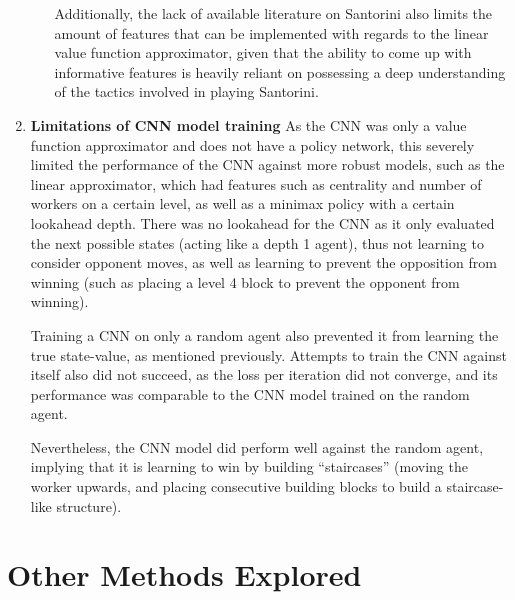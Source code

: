 \documentclass[a4paper,12pt,table]{article}
\begin{document}
\begin{enumerate}
\begin{itemize}
        Additionally, the lack of available literature on Santorini also limits the amount of features that can be implemented with regards to the linear value function approximator, given that the ability to come up with informative features is heavily reliant on possessing a deep understanding of the tactics involved in playing Santorini.\\
    \newline
    \newline
    \end{itemize}
   
    \item \textbf{Limitations of CNN model training}
    \newline
    As the CNN was only a value function approximator and does not have a policy network, this severely limited the performance of the CNN against more robust models, such as the linear approximator, which had features such as centrality and number of workers on a certain level, as well as a minimax policy with a certain lookahead depth. There was no lookahead for the CNN as it only evaluated the next possible states (acting like a depth 1 agent), thus not learning to consider opponent moves, as well as learning to prevent the opposition from winning (such as placing a level 4 block to prevent the opponent from winning).  \par

    Training a CNN on only a random agent also prevented it from learning the true state-value, as mentioned previously. Attempts to train the CNN against itself also did not succeed, as the loss per iteration did not converge, and its performance was comparable to the CNN model trained on the random agent. \par

    Nevertheless, the CNN model did perform well against the random agent, implying that it is learning to win by building “staircases” (moving the worker upwards, and placing consecutive building blocks to build a staircase-like structure).  \par

\end{enumerate}

\section{Other Methods Explored}
\end{document}
